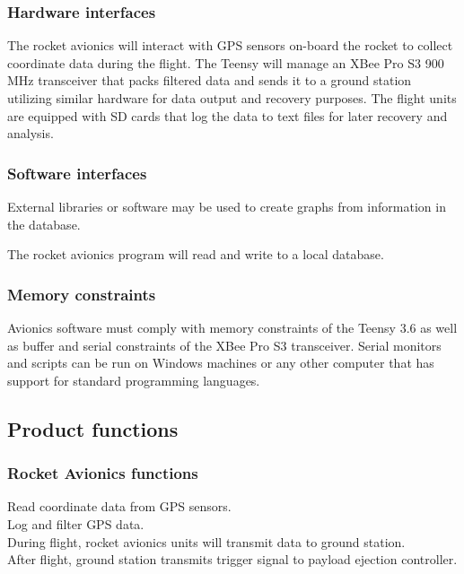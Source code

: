 \documentclass[onecolumn, draftclsnofoot, 10pt, compsoc]{IEEEtran}
\begin{document}
\subsubsection{Hardware interfaces}
The rocket avionics will interact with GPS sensors on-board the rocket to collect coordinate data during the flight. The Teensy will manage an XBee Pro S3 900 MHz transceiver that packs filtered data and sends it to a ground station utilizing similar hardware for data output and recovery purposes. The flight units are equipped with SD cards that log the data to text files for later recovery and analysis. 

\subsubsection{Software interfaces}
External libraries or software may be used to create graphs from information in the database.

The rocket avionics program will read and write to a local database.

\subsubsection{Memory constraints}
Avionics software must comply with memory constraints of the Teensy 3.6 as well as buffer and serial constraints of the XBee Pro S3 transceiver. Serial monitors and scripts can be run on Windows machines or any other computer that has support for standard programming languages.



\subsection{Product functions}
\subsubsection{Rocket Avionics functions}
Read coordinate data from GPS sensors.\\
Log and filter GPS data.\\
During flight, rocket avionics units will transmit data to ground station. \\
After flight, ground station transmits trigger signal to payload ejection controller. \\
\end{document}
